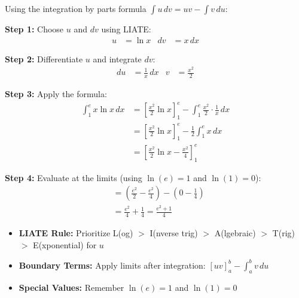 \begin{solution}
Using the integration by parts formula $\int u \, dv = uv - \int v \, du$:

\textbf{Step 1:} Choose $u$ and $dv$ using LIATE:
\begin{align*}
    u &= \ln x & dv &= x \, dx
\end{align*}

\textbf{Step 2:} Differentiate $u$ and integrate $dv$:
\begin{align*}
    du &= \frac{1}{x} \, dx & v &= \frac{x^2}{2}
\end{align*}

\textbf{Step 3:} Apply the formula:
\begin{align*}
    \int_{1}^{e} x \ln x \, dx &= \left[ \frac{x^2}{2} \ln x \right]_{1}^{e} - \int_{1}^{e} \frac{x^2}{2} \cdot \frac{1}{x} \, dx \\[8pt]
    &= \left[ \frac{x^2}{2} \ln x \right]_{1}^{e} - \frac{1}{2} \int_{1}^{e} x \, dx \\[8pt]
    &= \left[ \frac{x^2}{2} \ln x - \frac{x^2}{4} \right]_{1}^{e}
\end{align*}

\textbf{Step 4:} Evaluate at the limits (using $\ln(e)=1$ and $\ln(1)=0$):
\begin{align*}
    &= \left( \frac{e^2}{2} - \frac{e^2}{4} \right) - \left( 0 - \frac{1}{4} \right) \\[8pt]
    &= \frac{e^2}{4} + \frac{1}{4} = \boxed{\frac{e^2 + 1}{4}}
\end{align*}
\end{solution}

\begin{takeaways}
\begin{itemize}
\item \textbf{LIATE Rule:} Prioritize L(og) $>$ I(nverse trig) $>$ A(lgebraic) $>$ T(rig) $>$ E(xponential) for $u$
\item \textbf{Boundary Terms:} Apply limits after integration: $[uv]_a^b - \int_a^b v \, du$
\item \textbf{Special Values:} Remember $\ln(e) = 1$ and $\ln(1) = 0$
\end{itemize}
\end{takeaways}

\vspace{1.5cm}



